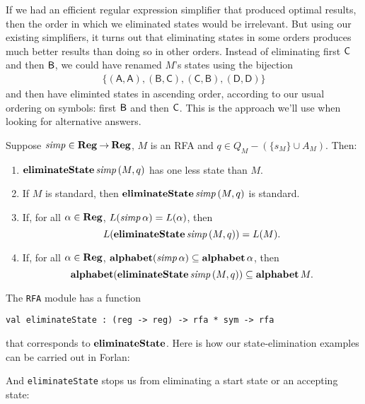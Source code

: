 If we had an efficient regular expression simplifier that produced
optimal results, then the order in which we eliminated states would be
irrelevant.  But using our existing simplifiers, it turns out that
eliminating states in some orders produces much better results than
doing so in other orders.  Instead of eliminating first $\mathsf{C}$ and then
$\mathsf{B}$, we could have renamed $M$'s states using the bijection
\begin{gather*}
\{\mathsf{(A, A), (B, C), (C, B), (D, D)}\}  
\end{gather*}
and then have eliminted states in ascending order, according
to our usual ordering on symbols: first $\mathsf{B}$ and then $\mathsf{C}$.
This is the approach we'll use when looking for alternative answers.

\begin{proposition}
Suppose ${\it simp}\in\mathbf{Reg}\mathbin{\to}\mathbf{Reg}$, $M$ is an RFA and $q\in
Q_M-(\{s_M\}\cup A_M)$.  Then:
\begin{enumerate}[\quad(1)]
\item $\mathbf{eliminateState}\,{\it simp}\,(M,q)$ has one less state than $M$.

\item If $M$ is standard, then $\mathbf{eliminateState}\,{\it simp}\,(M,q)$ is standard.

\item If, for all $\alpha\in\mathbf{Reg}$, $L({\it simp}\,\alpha) = L(\alpha)$,
  then
  \begin{displaymath}
    L(\mathbf{eliminateState}\,{\it simp}\,(M,q)) = L(M) .  
  \end{displaymath}

\item If, for all $\alpha\in\mathbf{Reg}$, $\mathbf{alphabet}({\it simp}\,\alpha)\subseteq
  \mathbf{alphabet}\,\alpha$, then
  \begin{displaymath}
    \mathbf{alphabet}(\mathbf{eliminateState}\,{\it simp}\,(M,q)) \subseteq \mathbf{alphabet}\,M .
  \end{displaymath}
\end{enumerate}
\end{proposition}

The \texttt{RFA} module has a function
\begin{verbatim}
val eliminateState : (reg -> reg) -> rfa * sym -> rfa
\end{verbatim}
%
that corresponds to $\mathbf{eliminateState}$.
Here is how our state-elimination examples can be carried out in Forlan:

And \texttt{eliminateState} stops us from eliminating a start state or
an accepting state:


